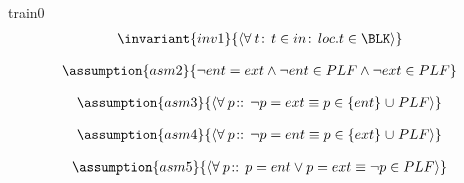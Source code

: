 \documentclass[12pt]{amsart}
\begin{document}
\begin{machine}{train0}
\begin{align*}
\invariant{inv1}
{	\qforall{t}{t \in in}{loc.t \in \BLK}	}
\end{align*}

\begin{align*}
\assumption{asm2}
{	\neg ent = ext \land \neg ent \in PLF \land \neg ext \in PLF	}
\end{align*}

\begin{align*}
\assumption{asm3}
{	\qforall{p}{}{ \neg p = ext \equiv p \in \{ent\} \bunion PLF }}
\end{align*}

\begin{align*}
\assumption{asm4}
{	\qforall{p}{}{ \neg p = ent \equiv p \in \{ext\} \bunion PLF }	}
\end{align*}

\begin{align*}
\assumption{asm5}
{	\qforall{p}{}{ p = ent \lor p = ext \equiv \neg p \in PLF }	}
\end{align*}


\end{machine}
\end{document}
